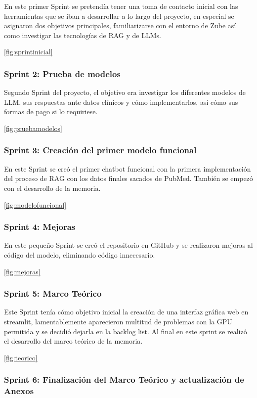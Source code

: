 En este primer Sprint se pretendía tener una toma de contacto inicial con las herramientas que se iban a desarrollar a lo largo del proyecto, en especial se asignaron dos objetivos principales, familiarizarse con el entorno de Zube así como investigar las tecnologías de RAG y de LLMs.

\ref{fig:sprintinicial}

\subsubsection{Sprint 2: Prueba de modelos}

Segundo Sprint del proyecto, el objetivo era investigar los diferentes modelos de LLM, sus respuestas ante datos clínicos y cómo implementarlos, así cómo sus formas de pago si lo requiriese.

\ref{fig:pruebamodelos}

\subsubsection{Sprint 3: Creación del primer modelo funcional}

En este Sprint se creó el primer chatbot funcional con la primera implementación del proceso de RAG con los datos finales sacados de PubMed. También se empezó con el desarrollo de la memoria.

\ref{fig:modelofuncional}

\subsubsection{Sprint 4: Mejoras}

En este pequeño Sprint se creó el repositorio en GitHub y se realizaron mejoras al código del modelo, eliminando código innecesario.

\ref{fig:mejoras}

\subsubsection{Sprint 5: Marco Teórico}

Este Sprint tenía cómo objetivo inicial la creación de una interfaz gráfica web en streamlit, lamentablemente aparecieron multitud de problemas con la GPU permitida y se decidió dejarla en la backlog list. Al final en este sprint se realizó el desarrollo del marco teórico de la memoria.

\ref{fig:teorico}

\subsubsection{Sprint 6: Finalización del Marco Teórico y actualización de Anexos}

